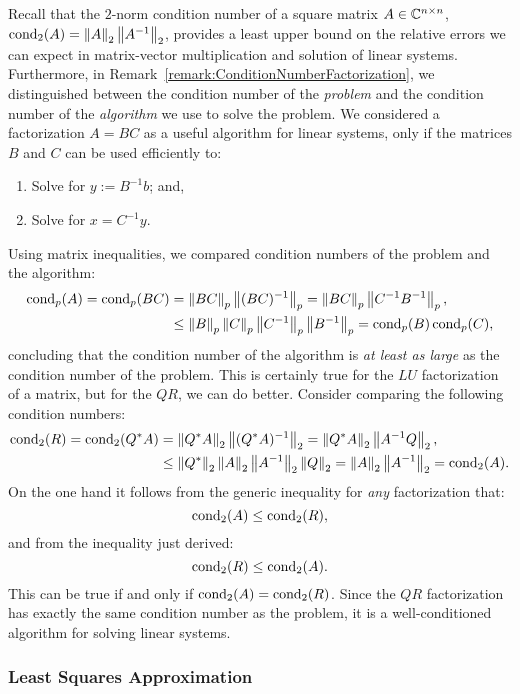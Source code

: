 \begin{remark}
Recall that the $2$-norm condition number of a square matrix $A\in\mathbb{C}^{n\times n}$, $\operatorname{cond}_2(A) = \left\|{A}\right\|_2\left\|{A^{-1}}\right\|_2$, provides a least upper bound on the relative errors we can expect in matrix-vector multiplication and solution of linear systems. Furthermore, in Remark~\ref{remark:ConditionNumberFactorization}, we distinguished between the condition number of the {\em problem} and the condition number of the {\em algorithm} we use to solve the problem. We considered a factorization $A=BC$ as a useful algorithm for linear systems, only if the matrices $B$ and $C$ can be used efficiently to:
\begin{enumerate}
\item Solve for $y := B^{-1}b$; and,
\item Solve for $x = C^{-1}y$.
\end{enumerate}
Using matrix inequalities, we compared condition numbers of the problem and the algorithm:
\begin{align*}
\operatorname{cond}_p(A) = \operatorname{cond}_p(BC) & = \left\|{BC}\right\|_p\left\|{(BC)^{-1}}\right\|_p = \left\|{BC}\right\|_p\left\|{C^{-1}B^{-1}}\right\|_p,\\
& \le \left\|{B}\right\|_p\left\|{C}\right\|_p\left\|{C^{-1}}\right\|_p\left\|{B^{-1}}\right\|_p = \operatorname{cond}_p(B)\operatorname{cond}_p(C),
\end{align*}
concluding that the condition number of the algorithm is {\em at least as large} as the condition number of the problem. This is certainly true for the $LU$ factorization of a matrix, but for the $QR$, we can do better. Consider comparing the following condition numbers:
\begin{align*}
\operatorname{cond}_2(R) = \operatorname{cond}_2(Q^* A) & = \left\|{Q^* A}\right\|_2\left\|{(Q^*A)^{-1}}\right\|_2 = \left\|{Q^*A}\right\|_2\left\|{A^{-1}Q}\right\|_2,\\
& \le \left\|{Q^*}\right\|_2\left\|{A}\right\|_2 \left\|{A^{-1}}\right\|_2\left\|{Q}\right\|_2 = \left\|{A}\right\|_2\left\|{A^{-1}}\right\|_2 = \operatorname{cond}_2(A).
\end{align*}
On the one hand it follows from the generic inequality for {\em any} factorization that:
\[
\operatorname{cond}_2(A) \le \operatorname{cond}_2(R),
\]
and from the inequality just derived:
\[
\operatorname{cond}_2(R) \le \operatorname{cond}_2(A).
\]
This can be true if and only if $\operatorname{cond}_2(A) = \operatorname{cond}_2(R)$. Since the $QR$ factorization has exactly the same condition number as the problem, it is a well-conditioned algorithm for solving linear systems.
\end{remark}

\subsubsection{Least Squares Approximation}

